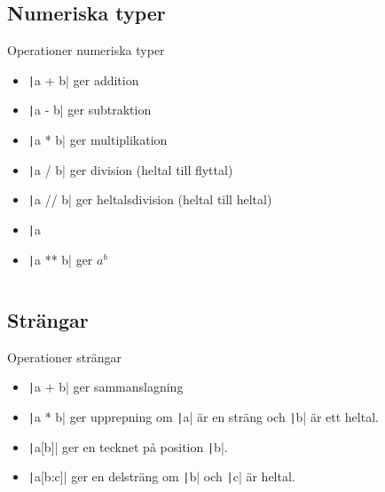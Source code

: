 \subsection{Numeriska typer}

\begin{frame}[fragile]
  \begin{block}{Operationer numeriska typer}
    \begin{itemize}
      \item \texttt|a + b| ger addition
      \item \texttt|a - b| ger subtraktion
      \item \texttt|a * b| ger multiplikation
      \item \texttt|a / b| ger division (heltal till flyttal)
      \item \texttt|a // b| ger heltalsdivision (heltal till heltal)
      \item \texttt|a %
      \item \texttt|a ** b| ger \(a^b\)
    \end{itemize}
  \end{block}
\end{frame}

\begin{frame}[fragile]
  \begin{example}
    \inputminted[linenos]{python}{examples/mod.py}
  \end{example}
\end{frame}

\subsection{Strängar}

\begin{frame}[fragile]
  \begin{block}{Operationer strängar}
    \begin{itemize}
      \item \texttt|a + b| ger sammanslagning
      \item \texttt|a * b| ger upprepning om \texttt|a| 
        är en sträng och \texttt|b| är ett heltal.
      \item \texttt|a[b]| ger en tecknet på position 
        \texttt|b|.
      \item \texttt|a[b:c]| ger en delsträng om 
        \texttt|b| och  \texttt|c| är heltal.
    \end{itemize}
  \end{block}
\end{frame}

